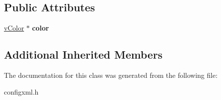 \subsection*{Public Attributes}
\begin{DoxyCompactItemize}
\item 
\hyperlink{classvColor}{v\+Color} $\ast$ {\bfseries color}\hypertarget{classconfigNode_a85efd068edef7e306702176596257d0d}{}\label{classconfigNode_a85efd068edef7e306702176596257d0d}

\end{DoxyCompactItemize}
\subsection*{Additional Inherited Members}


The documentation for this class was generated from the following file\+:\begin{DoxyCompactItemize}
\item 
configxml.\+h\end{DoxyCompactItemize}
